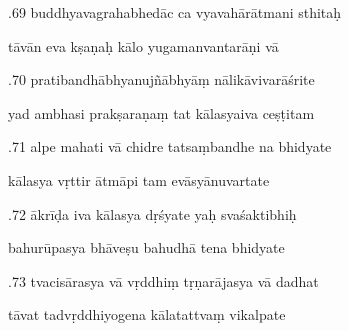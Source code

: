 \documentclass[article,12pt,a4paper]{memoir}%
\newcounter{parCount}
\begin{document}
	  
	  \pstart {}.69 buddhyavagrahabhedāc ca vyavahārātmani sthitaḥ 
	{}
	\pend%
      

	  
	  \pstart \leavevmode%
	tāvān eva kṣaṇaḥ kālo yugamanvantarāṇi vā 
	{}
	\pend%
      

	  
	  \pstart {}.70 pratibandhābhyanujñābhyāṃ nālikāvivarāśrite 
	{}
	\pend%
      

	  
	  \pstart \leavevmode%
	yad ambhasi prakṣaraṇaṃ tat kālasyaiva ceṣṭitam 
	{}
	\pend%
      

	  
	  \pstart {}.71 alpe mahati vā chidre tatsaṃbandhe na bhidyate 
	{}
	\pend%
      

	  
	  \pstart \leavevmode%
	kālasya vṛttir ātmāpi tam evāsyānuvartate 
	{}
	\pend%
      

	  
	  \pstart {}.72 ākrīḍa iva kālasya dṛśyate yaḥ svaśaktibhiḥ 
	{}
	\pend%
      

	  
	  \pstart \leavevmode%
	bahurūpasya bhāveṣu bahudhā tena bhidyate 
	{}
	\pend%
      

	  
	  \pstart {}.73 tvacisārasya vā vṛddhiṃ tṛṇarājasya vā dadhat 
	{}
	\pend%
      

	  
	  \pstart \leavevmode%
	tāvat tadvṛddhiyogena kālatattvaṃ vikalpate 
	{}
	\pend%
      
\end{document}

